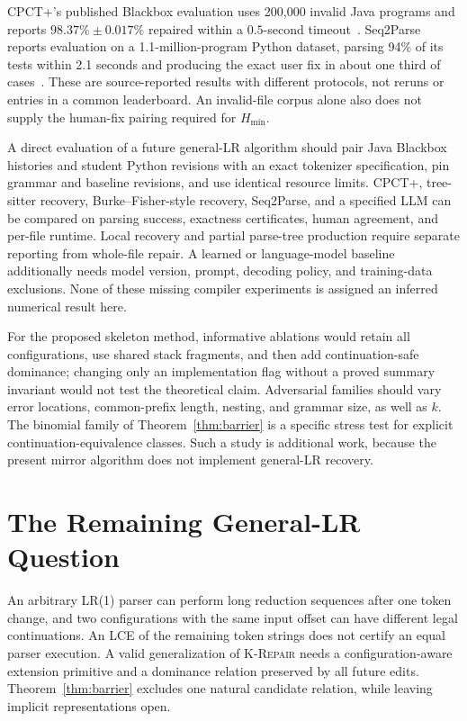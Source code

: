 \documentclass[sigconf,screen]{acmart}
\newcommand{\krepair}{\textsc{K-Repair}}
\theoremstyle{definition}
\begin{document}
CPCT+'s published Blackbox evaluation uses 200,000 invalid Java programs and reports $98.37\%\pm0.017\%$ repaired within a $0.5$-second timeout~\cite{cpct2020}. Seq2Parse reports evaluation on a 1.1-million-program Python dataset, parsing 94\% of its tests within 2.1 seconds and producing the exact user fix in about one third of cases~\cite{seq2parse2022}. These are source-reported results with different protocols, not reruns or entries in a common leaderboard. An invalid-file corpus alone also does not supply the human-fix pairing required for $H_{\mathrm{min}}$.

A direct evaluation of a future general-LR algorithm should pair Java Blackbox histories and student Python revisions with an exact tokenizer specification, pin grammar and baseline revisions, and use identical resource limits. CPCT+, tree-sitter recovery, Burke--Fisher-style recovery, Seq2Parse, and a specified LLM can be compared on parsing success, exactness certificates, human agreement, and per-file runtime. Local recovery and partial parse-tree production require separate reporting from whole-file repair. A learned or language-model baseline additionally needs model version, prompt, decoding policy, and training-data exclusions. None of these missing compiler experiments is assigned an inferred numerical result here.

For the proposed skeleton method, informative ablations would retain all configurations, use shared stack fragments, and then add continuation-safe dominance; changing only an implementation flag without a proved summary invariant would not test the theoretical claim. Adversarial families should vary error locations, common-prefix length, nesting, and grammar size, as well as $k$. The binomial family of Theorem~\ref{thm:barrier} is a specific stress test for explicit continuation-equivalence classes. Such a study is additional work, because the present mirror algorithm does not implement general-LR recovery.

\section{The Remaining General-LR Question}\label{sec:open}
An arbitrary LR(1) parser can perform long reduction sequences after one token change, and two configurations with the same input offset can have different legal continuations. An LCE of the remaining token strings does not certify an equal parser execution. A valid generalization of \krepair{} needs a configuration-aware extension primitive and a dominance relation preserved by all future edits. Theorem~\ref{thm:barrier} excludes one natural candidate relation, while leaving implicit representations open.
\end{document}
